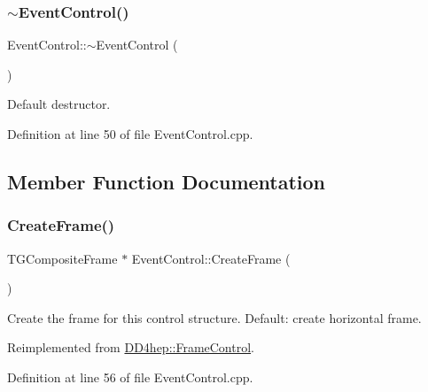 \subsubsection{\texorpdfstring{$\sim$\+Event\+Control()}{~EventControl()}}
{\footnotesize\ttfamily Event\+Control\+::$\sim$\+Event\+Control (\begin{DoxyParamCaption}{ }\end{DoxyParamCaption})\hspace{0.3cm}{\ttfamily [virtual]}}



Default destructor. 



Definition at line 50 of file Event\+Control.\+cpp.



\subsection{Member Function Documentation}
\hypertarget{class_d_d4hep_1_1_event_control_a10479ca8f5f5836f6e3a9c1367eea1fb}{}\label{class_d_d4hep_1_1_event_control_a10479ca8f5f5836f6e3a9c1367eea1fb} 
\subsubsection{\texorpdfstring{Create\+Frame()}{CreateFrame()}}
{\footnotesize\ttfamily T\+G\+Composite\+Frame $\ast$ Event\+Control\+::\+Create\+Frame (\begin{DoxyParamCaption}{ }\end{DoxyParamCaption})\hspace{0.3cm}{\ttfamily [virtual]}}



Create the frame for this control structure. Default\+: create horizontal frame. 



Reimplemented from \hyperlink{class_d_d4hep_1_1_frame_control_a3622593e0da13ddc3719d845782ec7be}{D\+D4hep\+::\+Frame\+Control}.



Definition at line 56 of file Event\+Control.\+cpp.

\hypertarget{class_d_d4hep_1_1_event_control_a4804b629feb785168b1ddb18592587bb}{}\label{class_d_d4hep_1_1_event_control_a4804b629feb785168b1ddb18592587bb} 
